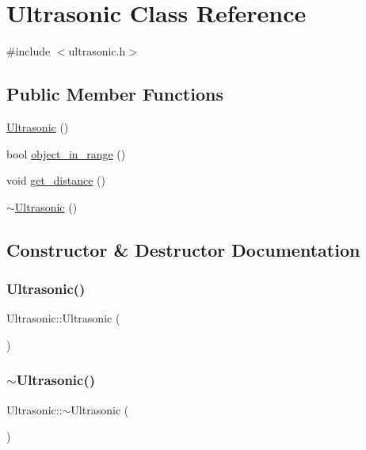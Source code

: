 \hypertarget{class_ultrasonic}{}\section{Ultrasonic Class Reference}
\label{class_ultrasonic}


{\ttfamily \#include $<$ultrasonic.\+h$>$}

\subsection*{Public Member Functions}
\begin{DoxyCompactItemize}
\item 
\mbox{\hyperlink{class_ultrasonic_aca6777e380e8df649cc547e0a5fdd417}{Ultrasonic}} ()
\item 
bool \mbox{\hyperlink{class_ultrasonic_aae6ae7ff42f37a52835dc66bba7e0201}{object\+\_\+in\+\_\+range}} ()
\item 
void \mbox{\hyperlink{class_ultrasonic_a3d4ff1956578fb0bec95ee140d30b751}{get\+\_\+distance}} ()
\item 
\mbox{\hyperlink{class_ultrasonic_ab5066b2bfeac723140c18b9f8340abad}{$\sim$\+Ultrasonic}} ()
\end{DoxyCompactItemize}


\subsection{Constructor \& Destructor Documentation}
\mbox{\label{class_ultrasonic_aca6777e380e8df649cc547e0a5fdd417}} 
\subsubsection{\texorpdfstring{Ultrasonic()}{Ultrasonic()}}
{\footnotesize\ttfamily Ultrasonic\+::\+Ultrasonic (\begin{DoxyParamCaption}{ }\end{DoxyParamCaption})}

\mbox{\label{class_ultrasonic_ab5066b2bfeac723140c18b9f8340abad}} 
\subsubsection{\texorpdfstring{$\sim$\+Ultrasonic()}{~Ultrasonic()}}
{\footnotesize\ttfamily Ultrasonic\+::$\sim$\+Ultrasonic (\begin{DoxyParamCaption}{ }\end{DoxyParamCaption})}



